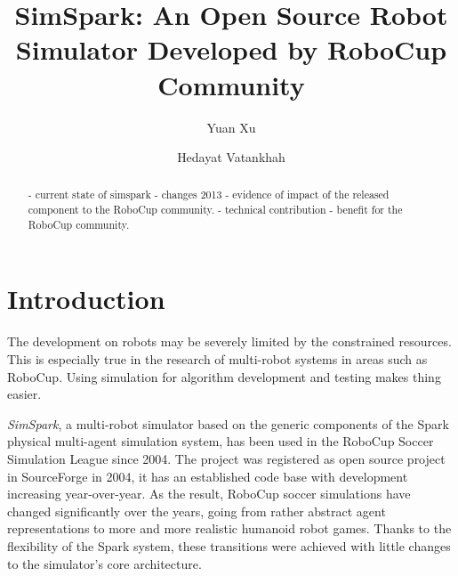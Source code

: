 \documentclass{llncs}
\begin{document}
\title{SimSpark: An Open Source Robot Simulator Developed by RoboCup Community}

\author{Yuan Xu \and Hedayat Vatankhah}


\maketitle

\begin{abstract}
  - current state of simspark
  - changes 2013
  - evidence of impact of the released component to the RoboCup community.
  - technical contribution
  - benefit for the RoboCup community.
\end{abstract}

\section{Introduction}
The development on robots may be severely limited by the constrained resources.
This is especially true in the research of multi-robot systems in areas such as RoboCup.
Using simulation for algorithm development and testing makes thing easier.

\textit{SimSpark}, a multi-robot simulator based on the generic components of the Spark\cite{OR05} physical multi-agent simulation system, has been used in the RoboCup Soccer Simulation League since 2004.
The project was registered as open source project in SourceForge in 2004, it has an established code base with development increasing year-over-year.
As the result, RoboCup soccer simulations have changed significantly over the years, going from rather abstract agent representations to more and more realistic humanoid robot games\cite{Boedecker2008,usermanual}.
Thanks to the flexibility of the Spark system, these transitions were achieved with little changes to the simulator's core architecture.
\end{document}
